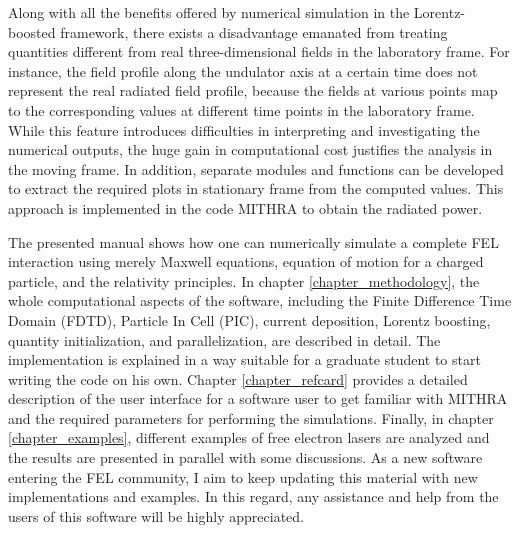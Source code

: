 Along with all the benefits offered by numerical simulation in the Lorentz-boosted framework, there exists a disadvantage emanated from treating quantities different from real three-dimensional fields in the laboratory frame.
%
For instance, the field profile along the undulator axis at a certain time does not represent the real radiated field profile, because the fields at various points map to the corresponding values at different time points in the laboratory frame.
%
While this feature introduces difficulties in interpreting and investigating the numerical outputs, the huge gain in computational cost justifies the analysis in the moving frame.
%
In addition, separate modules and functions can be developed to extract the required plots in stationary frame from the computed values.
%
This approach is implemented in the code MITHRA to obtain the radiated power.

The presented manual shows how one can numerically simulate a complete FEL interaction using merely Maxwell equations, equation of motion for a charged particle, and the relativity principles.
%
In chapter \ref{chapter_methodology}, the whole computational aspects of the software, including the Finite Difference Time Domain (FDTD), Particle In Cell (PIC), current deposition, Lorentz boosting, quantity initialization, and parallelization, are described in detail.
%
The implementation is explained in a way suitable for a graduate student to start writing the code on his own.
%
Chapter \ref{chapter_refcard} provides a detailed description of the user interface for a software user to get familiar with MITHRA and the required parameters for performing the simulations.
%
Finally, in chapter \ref{chapter_examples}, different examples of free electron lasers are analyzed and the results are presented in parallel with some discussions.
%
As a new software entering the FEL community, I aim to keep updating this material with new implementations and examples.
%
In this regard, any assistance and help from the users of this software will be highly appreciated.
